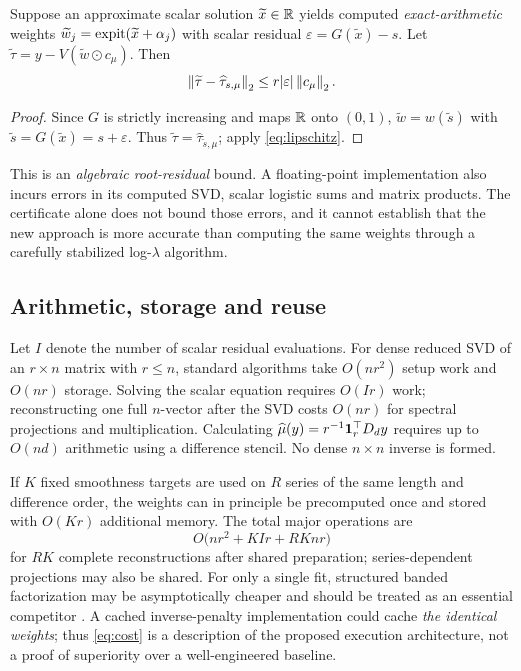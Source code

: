 \begin{corollary}\label{cor:certificate}
Suppose an approximate scalar solution $\widetilde x\in\mathbb R$
yields computed \emph{exact-arithmetic} weights
$\widetilde w_j=\operatorname{expit}(\widetilde x+\alpha_j)$
with scalar residual
$\varepsilon=G(\widetilde x)-s$.
Let $\widetilde\tau=y-V(\widetilde w\odot c_\mu)$.
Then
\[
\left\lVert\widetilde\tau-\widehat\tau_{s,\mu}\right\rVert_2
\le r|\varepsilon|\left\lVert c_\mu\right\rVert_2.
\]
\end{corollary}
\begin{proof}
Since $G$ is strictly increasing and maps $\mathbb R$ onto $(0,1)$,
$\widetilde w=w(\widetilde s)$ with
$\widetilde s=G(\widetilde x)=s+\varepsilon$.
Thus $\widetilde\tau=\widehat\tau_{\widetilde s,\mu}$;
apply \eqref{eq:lipschitz}.
\end{proof}

\begin{remark}
This is an \emph{algebraic root-residual} bound. A floating-point
implementation also incurs errors in its computed SVD, scalar
logistic sums and matrix products. The certificate alone
does not bound those errors, and it cannot establish that the
new approach is more accurate than computing the same
weights through a carefully stabilized log-$\lambda$
algorithm.
\end{remark}

\subsection{Arithmetic, storage and reuse}

Let $I$ denote the number of scalar residual evaluations.
For dense reduced SVD of an $r\times n$ matrix with $r\le n$,
standard algorithms take $O(nr^2)$ setup work and $O(nr)$
storage. Solving the scalar equation requires $O(Ir)$ work;
reconstructing one full $n$-vector after the SVD costs
$O(nr)$ for spectral projections and multiplication.
Calculating $\widehat\mu(y)=r^{-1}\mathbf 1_r^\top D_dy$
requires up to $O(nd)$ arithmetic using a difference
stencil. No dense $n\times n$ inverse is formed.

If $K$ fixed smoothness targets are used on $R$ series of
the same length and difference order, the weights can in
principle be precomputed once and stored with $O(Kr)$
additional memory. The total major operations are
\begin{equation}\label{eq:cost}
O\bigl(nr^2+KIr+RKn r\bigr)
\end{equation}
for $RK$ complete reconstructions after shared preparation;
series-dependent projections may also be shared.
For only a single fit, structured banded factorization may
be asymptotically cheaper and should be treated as an
essential competitor \citep{weinert2007}.
A cached inverse-penalty implementation could cache
\emph{the identical weights}; thus \eqref{eq:cost}
is a description of the proposed execution architecture,
not a proof of superiority over a well-engineered baseline.

